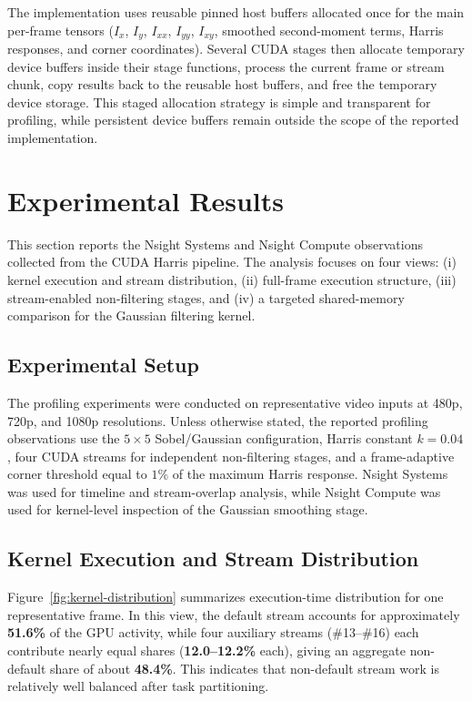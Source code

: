 \documentclass[conference]{IEEEtran}
\begin{document}
The implementation uses reusable pinned host buffers allocated once for the main per-frame tensors ($I_x$, $I_y$, $I_{xx}$, $I_{yy}$, $I_{xy}$, smoothed second-moment terms, Harris responses, and corner coordinates). Several CUDA stages then allocate temporary device buffers inside their stage functions, process the current frame or stream chunk, copy results back to the reusable host buffers, and free the temporary device storage. This staged allocation strategy is simple and transparent for profiling, while persistent device buffers remain outside the scope of the reported implementation.

\section{Experimental Results}
This section reports the Nsight Systems and Nsight Compute observations collected from the CUDA Harris pipeline. The analysis focuses on four views: (i) kernel execution and stream distribution, (ii) full-frame execution structure, (iii) stream-enabled non-filtering stages, and (iv) a targeted shared-memory comparison for the Gaussian filtering kernel.

\subsection{Experimental Setup}
The profiling experiments were conducted on representative video inputs at 480p, 720p, and 1080p resolutions. Unless otherwise stated, the reported profiling observations use the $5\times5$ Sobel/Gaussian configuration, Harris constant $k=0.04$, four CUDA streams for independent non-filtering stages, and a frame-adaptive corner threshold equal to $1\%$ of the maximum Harris response. Nsight Systems was used for timeline and stream-overlap analysis, while Nsight Compute was used for kernel-level inspection of the Gaussian smoothing stage.

\subsection{Kernel Execution and Stream Distribution}
Figure~\ref{fig:kernel-distribution} summarizes execution-time distribution for one representative frame. In this view, the default stream accounts for approximately \textbf{51.6\%} of the GPU activity, while four auxiliary streams (\#13--\#16) each contribute nearly equal shares (\textbf{12.0--12.2\%} each), giving an aggregate non-default share of about \textbf{48.4\%}. This indicates that non-default stream work is relatively well balanced after task partitioning.
\end{document}

